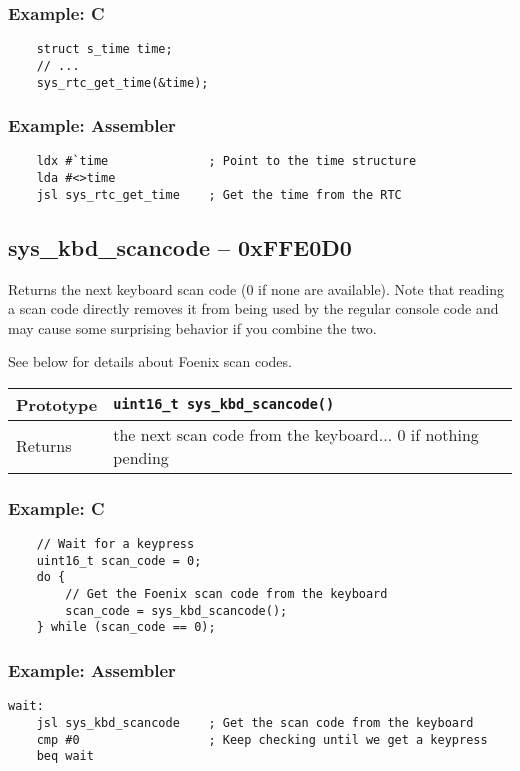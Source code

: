 \subsubsection*{Example: C}
\begin{lstlisting}
    struct s_time time;
    // ...
    sys_rtc_get_time(&time);
\end{lstlisting}

\subsubsection*{Example: Assembler}
\begin{verbatim}
    ldx #`time              ; Point to the time structure
    lda #<>time
    jsl sys_rtc_get_time    ; Get the time from the RTC
\end{verbatim}

\subsection*{sys\_kbd\_scancode -- 0xFFE0D0}
Returns the next keyboard scan code (0 if none are available). Note that reading a scan code directly removes it from being used by the regular console code and may cause some surprising behavior if you combine the two.

See below for details about Foenix scan codes.

\bigskip

\begin{tabular}{|l||l|} \hline
Prototype & \lstinline!uint16_t sys_kbd_scancode()! \\ \hline
Returns & the next scan code from the keyboard... 0 if nothing pending \\ \hline
\end{tabular}

\subsubsection*{Example: C}
\begin{lstlisting}
    // Wait for a keypress
    uint16_t scan_code = 0;
    do {
        // Get the Foenix scan code from the keyboard
        scan_code = sys_kbd_scancode();
    } while (scan_code == 0);
\end{lstlisting}

\subsubsection*{Example: Assembler}
\begin{verbatim}
wait:
    jsl sys_kbd_scancode    ; Get the scan code from the keyboard
    cmp #0                  ; Keep checking until we get a keypress
    beq wait
\end{verbatim}


